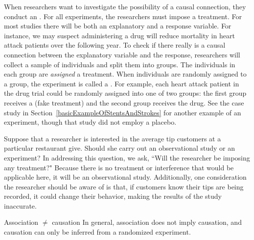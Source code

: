 When researchers want to investigate the possibility of a causal connection, they conduct an . For all experiments, the researchers must impose a treatment. For most studies there will be both an explanatory and a response variable. For instance, we may suspect administering a drug will reduce mortality in heart attack patients over the following year. To check if there really is a causal connection between the explanatory variable and the response, researchers will collect a sample of individuals and split them into groups. The individuals in each group are \emph{assigned} a treatment. When individuals are randomly assigned to a group, the experiment is called a . For example, each heart attack patient in the drug trial could be randomly assigned into one of two groups: the first group receives a  (fake treatment) and the second group receives the drug. See the case study in Section~\ref{basicExampleOfStentsAndStrokes} for another example of an experiment, though that study did not employ a placebo.

\begin{examplewrap}
\begin{nexample}{Suppose that a researcher is interested in the average tip customers at a particular restaurant give. Should she carry out an observational study or an experiment?}
In addressing this question, we ask, ``Will the researcher be imposing any treatment?"  Because there is no treatment or interference that would be applicable here, it will be an observational study. Additionally, one consideration the researcher should be aware of is that, if customers know their tips are being recorded, it could change their behavior, making the results of the study inaccurate.
\end{nexample}
\end{examplewrap}

\begin{onebox}{Association $\neq$ causation}
In general, association does not imply causation, and causation can only be inferred from a randomized experiment.
\end{onebox}


\D{\newpage}

